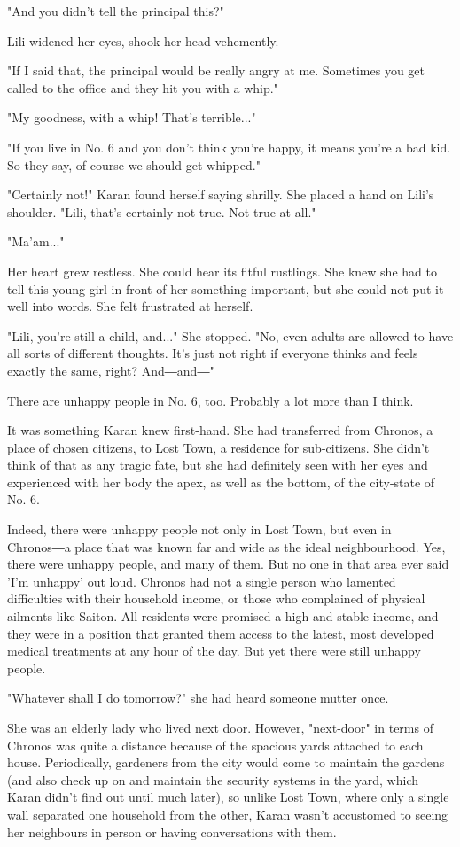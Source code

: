 "And you didn't tell the principal this?"

Lili widened her eyes, shook her head vehemently.

"If I said that, the principal would be really angry at me. Sometimes
you get called to the office and they hit you with a whip."

"My goodness, with a whip! That's terrible..."

"If you live in No. 6 and you don't think you're happy, it means you're
a bad kid. So they say, of course we should get whipped."

"Certainly not!" Karan found herself saying shrilly. She placed a hand
on Lili's shoulder. "Lili, that's certainly not true. Not true at all."

"Ma'am..."

Her heart grew restless. She could hear its fitful rustlings. She knew
she had to tell this young girl in front of her something important, but
she could not put it well into words. She felt frustrated at herself.

"Lili, you're still a child, and..." She stopped. "No, even adults are
allowed to have all sorts of different thoughts. It's just not right if
everyone thinks and feels exactly the same, right? And―and―"

There are unhappy people in No. 6, too. Probably a lot more than I
think.

It was something Karan knew first-hand. She had transferred from
Chronos, a place of chosen citizens, to Lost Town, a residence for
sub-citizens. She didn't think of that as any tragic fate, but she had
definitely seen with her eyes and experienced with her body the apex, as
well as the bottom, of the city-state of No. 6.

Indeed, there were unhappy people not only in Lost Town, but even in
Chronos―a place that was known far and wide as the ideal neighbourhood.
Yes, there were unhappy people, and many of them. But no one in that
area ever said 'I'm unhappy' out loud. Chronos had not a single person
who lamented difficulties with their household income, or those who
complained of physical ailments like Saiton. All residents were promised
a high and stable income, and they were in a position that granted them
access to the latest, most developed medical treatments at any hour of
the day. But yet there were still unhappy people.

"Whatever shall I do tomorrow?" she had heard someone mutter once.

She was an elderly lady who lived next door. However, "next-door" in
terms of Chronos was quite a distance because of the spacious yards
attached to each house. Periodically, gardeners from the city would come
to maintain the gardens (and also check up on and maintain the security
systems in the yard, which Karan didn't find out until much later), so
unlike Lost Town, where only a single wall separated one household from
the other, Karan wasn't accustomed to seeing her neighbours in person or
having conversations with them.

